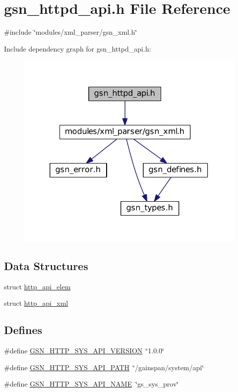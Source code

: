 \hypertarget{a00509}{
\section{gsn\_\-httpd\_\-api.h File Reference}
\label{a00509}
}
{\ttfamily \#include \char`\"{}modules/xml\_\-parser/gsn\_\-xml.h\char`\"{}}\par
Include dependency graph for gsn\_\-httpd\_\-api.h:
\nopagebreak
\begin{figure}[H]
\begin{center}
\leavevmode
\includegraphics[width=320pt]{a00741}
\end{center}
\end{figure}
\subsection*{Data Structures}
\begin{DoxyCompactItemize}
\item 
struct \hyperlink{a00446}{http\_\-api\_\-elem}
\item 
struct \hyperlink{a00447}{http\_\-api\_\-xml}
\end{DoxyCompactItemize}
\subsection*{Defines}
\begin{DoxyCompactItemize}
\item 
\#define \hyperlink{a00509_a5512b1f84d7e1036e19eb3ee62d51359}{GSN\_\-HTTP\_\-SYS\_\-API\_\-VERSION}~\char`\"{}1.0.0\char`\"{}
\item 
\#define \hyperlink{a00509_af58f9e1e5fd65a1413e6befa3e57a203}{GSN\_\-HTTP\_\-SYS\_\-API\_\-PATH}~\char`\"{}/gainspan/system/api\char`\"{}
\item 
\#define \hyperlink{a00509_a4207c446f2a0505eac2dee1a4136a2b8}{GSN\_\-HTTP\_\-SYS\_\-API\_\-NAME}~\char`\"{}gs\_\-sys\_\-prov\char`\"{}
\end{DoxyCompactItemize}
